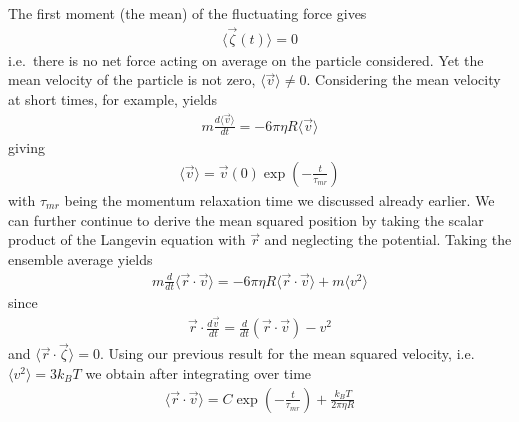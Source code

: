 \documentclass[letterpaper,10pt,english]{sphinxmanual}
\begin{document}
\sphinxAtStartPar
The first moment (the mean) of the fluctuating force gives
\begin{equation*}
\begin{split}\langle\vec{\zeta}(t) \rangle =0\end{split}
\end{equation*}
\sphinxAtStartPar
i.e. there is no net force acting on average on the particle considered. Yet the mean velocity of the particle is not zero, \(\langle \vec{v}\rangle\neq 0\). Considering the mean velocity at short times, for example, yields
\begin{equation*}
\begin{split}m\frac{d\langle \vec{v}\rangle}{dt}=-6\pi \eta R \langle \vec{v}\rangle\end{split}
\end{equation*}
\sphinxAtStartPar
giving
\begin{equation*}
\begin{split}\langle \vec{v}\rangle=\vec{v}(0)\exp\left ( -\frac{t}{\tau_{mr}}\right)\end{split}
\end{equation*}
\sphinxAtStartPar
with \(\tau_{mr}\) being the momentum relaxation time we discussed already earlier. We can further continue to derive the mean squared position by taking the scalar product of the Langevin equation with \(\vec{r}\) and neglecting the potential. Taking the ensemble average yields
\begin{equation*}
\begin{split}m\frac{d}{dt}\langle \vec{r}\cdot \vec{v}\rangle =-6\pi \eta R \langle \vec{r}\cdot \vec{v}\rangle + m\langle v^2\rangle\end{split}
\end{equation*}
\sphinxAtStartPar
since
\begin{equation*}
\begin{split}\vec{r}\cdot \frac{d\vec{v}}{dt}=\frac{d}{dt}(\vec{r}\cdot \vec{v})-v^2\end{split}
\end{equation*}
\sphinxAtStartPar
and \(\langle \vec{r}\cdot \vec{\zeta}\rangle =0\). Using our previous result for the mean squared velocity, i.e. \(\langle v^2\rangle =3k_B T\) we obtain after integrating over time
\begin{equation*}
\begin{split}\langle \vec{r}\cdot \vec{v}\rangle =C\exp\left ( -\frac{t}{\tau_{mr}}\right)+ \frac{k_B T}{2\pi\eta R}\end{split}
\end{equation*}
\end{document}
